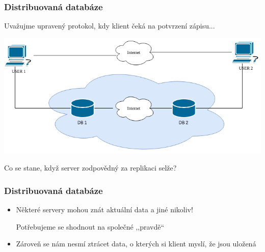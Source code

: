 \documentclass[usenames,dvipsnames,9pt]{beamer}
\begin{document}
\begin{frame}
  \frametitle{Distribuovaná databáze}

  {\large Uvažujme upravený protokol, kdy klient čeká na potvrzení zápisu...}

  \begin{center}
    \includegraphics[width=0.8\linewidth]{12/figs/pdv_cloud.png}
  \end{center}

  \pause
  \begin{center}
    \Large Co se stane, když server zodpovědný za replikaci selže?
  \end{center}
\end{frame}

\begin{frame}
  \frametitle{Distribuovaná databáze}

  {\large\bf
    \begin{itemize}
      \item[\faWarning] Některé servery mohou znát aktuální data a jiné nikoliv!

                        \hfill {\normalfont\Large Potřebujeme se shodnout na společné ,,pravdě``} \\[2em]

      \pause
      \item[\faWarning] Zároveň se nám nesmí ztrácet data, o kterých si klient myslí, že jsou uložená
    \end{itemize}
  }
\end{frame}
\end{document}
